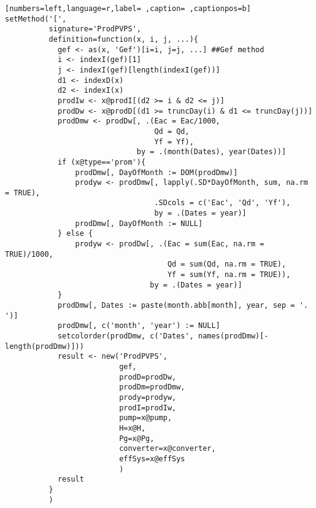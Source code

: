 \begin{lstlisting}[numbers=left,language=r,label= ,caption= ,captionpos=b]
setMethod('[',
          signature='ProdPVPS',
          definition=function(x, i, j, ...){
            gef <- as(x, 'Gef')[i=i, j=j, ...] ##Gef method
            i <- indexI(gef)[1]
            j <- indexI(gef)[length(indexI(gef))]
            d1 <- indexD(x)
            d2 <- indexI(x)
            prodIw <- x@prodI[(d2 >= i & d2 <= j)]
            prodDw <- x@prodD[(d1 >= truncDay(i) & d1 <= truncDay(j))]
            prodDmw <- prodDw[, .(Eac = Eac/1000,
                                  Qd = Qd,
                                  Yf = Yf),
                              by = .(month(Dates), year(Dates))]
            if (x@type=='prom'){
                prodDmw[, DayOfMonth := DOM(prodDmw)]
                prodyw <- prodDmw[, lapply(.SD*DayOfMonth, sum, na.rm = TRUE),
                                  .SDcols = c('Eac', 'Qd', 'Yf'),
                                  by = .(Dates = year)]
                prodDmw[, DayOfMonth := NULL]
            } else {
                prodyw <- prodDw[, .(Eac = sum(Eac, na.rm = TRUE)/1000,
                                     Qd = sum(Qd, na.rm = TRUE),
                                     Yf = sum(Yf, na.rm = TRUE)),
                                 by = .(Dates = year)]
            }
            prodDmw[, Dates := paste(month.abb[month], year, sep = '. ')]
            prodDmw[, c('month', 'year') := NULL]
            setcolorder(prodDmw, c('Dates', names(prodDmw)[-length(prodDmw)]))
            result <- new('ProdPVPS',
                          gef,
                          prodD=prodDw,
                          prodDm=prodDmw,
                          prody=prodyw,
                          prodI=prodIw,
                          pump=x@pump,
                          H=x@H,
                          Pg=x@Pg,
                          converter=x@converter,
                          effSys=x@effSys
                          )
            result
          }
          )
\end{lstlisting}
